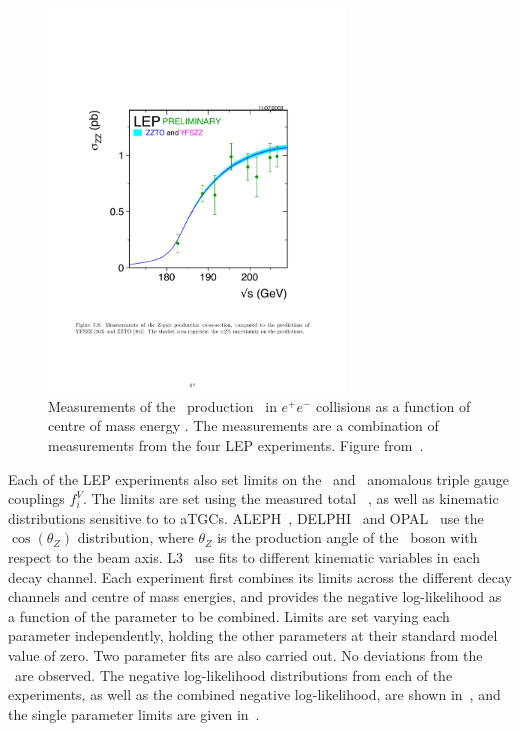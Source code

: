 \begin{figure}
\centering
        \includegraphics[width=0.7\textwidth]{lep_cx}
    \caption[Measurements of the \ZZ\ production \cx\ in  $e^+e^-$
    collisions at LEP as a function of centre of mass energy \sqrts.]{Measurements of the \ZZ\ production \cx\ in  $e^+e^-$
    collisions as a function of centre of mass energy \sqrts. The
    measurements are a combination of measurements from the four LEP
    experiments. Figure from~\cite{bib:LEPEW2006}.}
    \label{fig:lep-cx}
\end{figure}

Each of the LEP experiments also set limits on the \ZZZ\ and \ZZg\ anomalous
triple gauge couplings $f_{i}^{V}$. The limits are set using the measured total
\ZZ\ \cx, as well as kinematic distributions sensitive to to aTGCs.
ALEPH~\cite{Schael:1166743}, DELPHI~\cite{Bambade:1002930} and
OPAL~\cite{Abbiendi:2000kq} use the $\cos(\theta_{Z})$ distribution, where
$\theta_{Z}$ is the production angle of the \Z\ boson with respect to the beam
axis. L3~\cite{Acciarri:1999ug} use fits to different kinematic variables in
each decay channel. Each experiment first combines its limits across the different
decay channels and centre of mass energies, and provides the negative
log-likelihood as a function of the parameter to be combined. Limits are set
varying each parameter independently, holding the other parameters at their
standard model value of zero. Two parameter
fits are also carried out. No deviations from the \sm\ are observed. The
negative log-likelihood distributions from each of the experiments, as well as the
combined negative log-likelihood, are shown in~, and the single
parameter limits are given in~.

